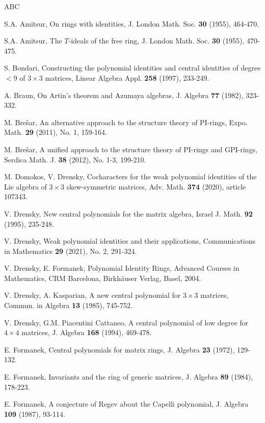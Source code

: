 \documentclass[10]{amsart}
\theoremstyle{definition}
\begin{document}
\begin{thebibliography}{ABC}

S.A. Amitsur,
On rings with identities,
J. London Math. Soc. {\bf 30} (1955), 464-470.

S.A. Amitsur,
The $T$-ideals of the free ring,
J. London Math. Soc. {\bf 30} (1955), 470-475.

S. Bondari,
Constructing the polynomial identities and central identities of degree $<9$
of $3\times 3$ matrices,
Linear Algebra Appl. {\bf 258} (1997), 233-249.

A. Braun,
On Artin's theorem and Azumaya algebras,
J. Algebra {\bf 77} (1982), 323-332.

M. Bre\v{s}ar,
An alternative approach to the structure theory of PI-rings,
Expo. Math. {\bf 29} (2011), No. 1, 159-164.

M. Bre\v{s}ar,
A unified approach to the structure theory of PI-rings and GPI-rings,
Serdica Math. J. {\bf 38} (2012), No. 1-3, 199-210.

M. Domokos, V. Drensky,
Cocharacters for the weak polynomial identities of the Lie algebra of $3\times 3$ skew-symmetric matrices,
Adv. Math. {\bf 374} (2020), article 107343.

V. Drensky,
New central polynomials for the matrix algebra,
Israel J. Math. {\bf 92} (1995), 235-248.

V. Drensky,
Weak polynomial identities and their applications,
Communications in Mathematics {\bf 29} (2021), No. 2, 291-324.

V. Drensky, E. Formanek,
Polynomial Identity Rings,
Advanced Courses in Mathematics, CRM Barcelona, Birkh\"auser Verlag, Basel, 2004.

V. Drensky, A. Kasparian,
A new central polynomial for $3 \times 3$ matrices,
Commun. in Algebra {\bf 13} (1985), 745-752.

V. Drensky, G.M. Piacentini Cattaneo,
A central polynomial of low degree for $4 \times 4$ matrices,
J. Algebra {\bf 168} (1994), 469-478.

E. Formanek,
Central polynomials for matrix rings,
J. Algebra {\bf 23} (1972), 129-132.

E. Formanek,
Invariants and the ring of generic matrices,
J. Algebra {\bf 89} (1984), 178-223.

E. Formanek,
A conjecture of Regev about the Capelli polynomial,
J. Algebra {\bf 109} (1987), 93-114.


\end{thebibliography}
\end{document}
